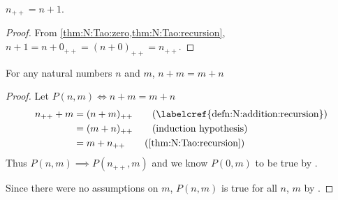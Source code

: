 \begin{cor}
    $n_{++} = n + 1$.
\end{cor}

\begin{proof}
    From \cref{thm:N:Tao:zero,thm:N:Tao:recursion}, $n + 1 = n + 0_{++} = (n + 0)_{++} = n_{++}$.
\end{proof}

\begin{prop} \label{thm:N:Tao:addition_is_commutative}
For any natural numbers $n$ and $m$, $n + m = m + n$
\end{prop}

\begin{proof}
    Let $P(n, m) \iff n + m = m + n$
    \begin{align*}
        n_{++} + m &= (n + m)_{++} \tag{\labelcref{defn:N:addition:recursion}} \\
                   &= (m + n)_{++} \tag{induction hypothesis} \\
                   &= m + n_{++}   \tag{\cref{thm:N:Tao:recursion}}
    \end{align*}
    Thus $P(n, m) \implies P(n_{++}, m)$ and we know $P(0, m)$ to be true by .

    Since there were no assumptions on $m$, $P(n, m)$ is true for all $n$, $m$ by .
\end{proof}

